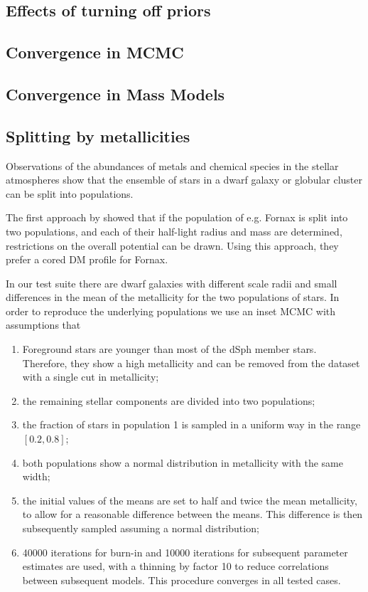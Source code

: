 \subsection{Effects of turning off priors}



\subsection{Convergence in MCMC}




\subsection{Convergence in Mass Models}




\subsection{Splitting by metallicities}\label{sec:metals}

Observations of the abundances of metals and chemical species in the
stellar atmospheres show that the ensemble of stars in a dwarf galaxy
or globular cluster can be split into populations.

The first approach by \cite{WalkerPenarrubia2012} showed that if the
population of e.g. Fornax is split into two populations, and each of
their half-light radius and mass are determined, restrictions on the
overall potential can be drawn. Using this approach, they prefer a
cored DM profile for Fornax.

In our test suite there are dwarf galaxies with different scale radii
and small differences in the mean of the metallicity for the two
populations of stars. In order to reproduce the underlying populations
we use an inset MCMC with assumptions that

\begin{enumerate}
\item Foreground stars are younger than most of the dSph member
  stars. Therefore, they show a high metallicity and can be removed
  from the dataset with a single cut in metallicity;
\item the remaining stellar components are divided into two
  populations;
\item the fraction of stars in population 1 is sampled in a uniform
  way in the range $[0.2,0.8]$;
\item both populations show a normal distribution in metallicity with
  the same width;
\item the initial values of the means are set to half and twice the
  mean metallicity, to allow for a reasonable difference between the
  means. This difference is then subsequently sampled assuming a
  normal distribution;
\item 40000 iterations for burn-in and 10000 iterations for subsequent
  parameter estimates are used, with a thinning by factor 10 to reduce
  correlations between subsequent models. This procedure converges in
  all tested cases.
\end{enumerate}

